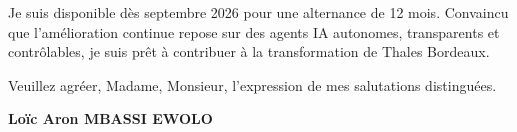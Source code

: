 \documentclass[a4paper,11pt]{article}
\begin{document}
\vspace{0.8em}
Je suis disponible dès septembre 2026 pour une alternance de 12 mois. Convaincu que l'amélioration continue repose sur des agents IA autonomes, transparents et contrôlables, je suis prêt à contribuer à la transformation de Thales Bordeaux.

\vspace{1.5em}
\noindent Veuillez agréer, Madame, Monsieur, l'expression de mes salutations distinguées.

\vspace{2em}
\noindent \textbf{Loïc Aron MBASSI EWOLO}
\end{document}
